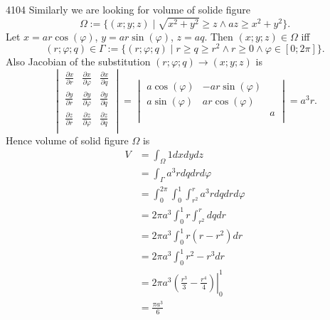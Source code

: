 \documentclass[12pt,a4paper]{article}
\begin{document}
    \begin{problem}{4104}
        Similarly we are looking for volume of solide figure
        \[\Omega := \{(x; y; z) \mid \sqrt{x^2 + y^2} \geqslant z \wedge az \geqslant x^2 + y^2\}.\]
        Let $x = ar \cos(\varphi)$, $y = ar \sin(\varphi)$, $z = aq$. Then $(x; y; z) \in \Omega$ iff
        \[(r; \varphi; q) \in \Gamma := \{(r; \varphi; q) \mid r \geqslant q \geqslant r^2 \wedge r \geqslant 0 \wedge \varphi \in [0; 2\pi]\}.\]
        Also Jacobian of the substitution $(r; \varphi; q) \to (x; y; z)$ is
        \[
            \begin{vmatrix}
                \frac{\partial x}{\partial r}& \frac{\partial x}{\partial \varphi}& \frac{\partial x}{\partial q}\\
                \frac{\partial y}{\partial r}& \frac{\partial y}{\partial \varphi}& \frac{\partial y}{\partial q}\\
                \frac{\partial z}{\partial r}& \frac{\partial z}{\partial \varphi}& \frac{\partial z}{\partial q}\\
            \end{vmatrix}
            =
            \begin{vmatrix}
                a\cos(\varphi)& -ar\sin(\varphi)& \\
                a\sin(\varphi)& ar\cos(\varphi)& \\
                & & a\\
            \end{vmatrix}
            = a^3 r.
        \]
        Hence volume of solid figure $\Omega$ is
        \begin{align*}
            V
            &= \int_\Omega 1 dx dy dz\\
            &= \int_\Gamma a^3 r dq dr d\varphi\\
            &= \int_0^{2\pi} \int_0^1 \int_{r^2}^r a^3 r dq dr d\varphi\\
            &= 2\pi a^3 \int_0^1 r \int_{r^2}^r dq dr\\
            &= 2\pi a^3 \int_0^1 r(r - r^2) dr\\
            &= 2\pi a^3 \int_0^1 r^2 - r^3 dr\\
            &= 2\pi a^3 \left.\left(\frac{r^3}{3} - \frac{r^4}{4}\right)\right|_0^1\\
            &= \frac{\pi a^3}{6}
        \end{align*}
    \end{problem}
\end{document}

